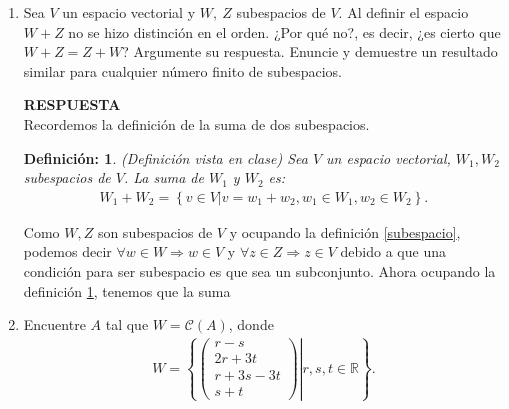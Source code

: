 \documentclass[11pt,letterpaper]{article}
\newcommand{\mR}{\mathbb{R}}
\newcommand{\res}{\textbf{RESPUESTA}\\}
\newtheorem{thmd}{Definición:}
\begin{document}
\begin{enumerate}
\item Sea $V$ un espacio vectorial y $W, \ Z$ subespacios de $V$. Al definir el espacio $W+Z$ no se hizo distinción en el orden. ¿Por qué no?, es decir, ¿es cierto que
$W + Z = Z + W$? Argumente su respuesta. Enuncie y demuestre un resultado similar para cualquier número finito de subespacios.

\res 
Recordemos la definición de la suma de dos subespacios.
\begin{framed}
    \begin{thmd} \label{suma_subespacios}
    (Definición vista en clase) Sea $V$ un espacio vectorial, $W_1,W_2$ subespacios de $V$. La suma de $W_1$ y $W_2$ es:
    \begin{align*}
    W_1+W_2=\left\{v\in V|v=w_1+w_2, w_1\in W_1, w_2\in W_2 \right\}.
    \end{align*}
    \end{thmd}
\end{framed} 
Como $W, Z$ son subespacios de $V$ y ocupando la definición \ref{subespacio}, podemos decir $\forall w\in W\Rightarrow w\in V$ y $\forall z\in Z\Rightarrow z\in V$ debido a que una condición para ser subespacio es que sea un subconjunto. Ahora ocupando la definición \ref{suma_subespacios}, tenemos que la suma 



\item Encuentre $A$ tal que $W=\mathcal{C}(A)$, donde
\begin{align*}
W=\left\{\left.\begin{pmatrix}
r-s\\
2r+3t\\
r+3s-3t\\
s+t
\end{pmatrix}\right| r,s,t\in \mR \right\}.
\end{align*}


\end{enumerate}
\end{document}
